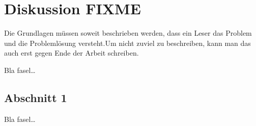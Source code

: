
\chapter{Diskussion FIXME}
\label{ch:Diskussion}
Die Grundlagen müssen soweit beschrieben
werden, dass ein Leser das Problem und
die Problemlösung  versteht.Um nicht zuviel 
zu beschreiben, kann man das auch erst gegen 
Ende der Arbeit schreiben.

Bla fasel\ldots

\section{Abschnitt 1}
\label{ch:Diskussion:sec:Abschnitt1}

Bla fasel\ldots

